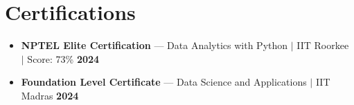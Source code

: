 \documentclass[9pt]{article}
\begin{document}
\section*{Certifications}
{\small
\begin{itemize}[leftmargin=*, nosep, topsep=1.5pt, itemsep=0.5pt]
    \item \textbf{NPTEL Elite Certification} — Data Analytics with Python $|$ IIT Roorkee $|$ Score: 73\% \hfill \textbf{2024}
    \item \textbf{Foundation Level Certificate} — Data Science and Applications $|$ IIT Madras \hfill \textbf{2024}
\end{itemize}  
}
\end{document}
